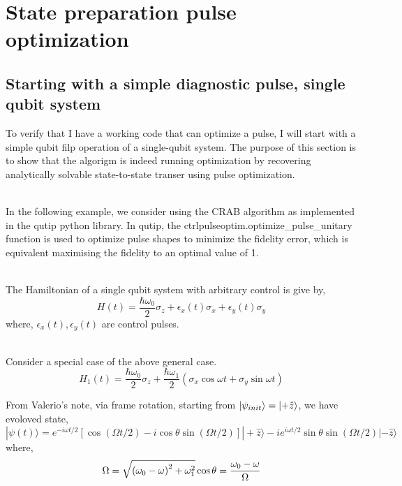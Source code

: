 \documentclass{article}
\begin{document}
\section{State preparation pulse optimization}

\subsection{Starting with a simple diagnostic pulse, single qubit system}
To verify that I have a working code that can optimize a pulse, 
I will start with a simple qubit filp operation of a single-qubit system.
The purpose of this section is to show that the algorigm is indeed running optimization
by recovering analytically solvable state-to-state transer using pulse optimization. 

\\

In the following example, we consider using the CRAB algorithm as implemented in the 
qutip python library. In qutip, the ctrlpulseoptim.optimize_pulse_unitary function is used 
to optimize pulse shapes to minimize the fidelity error, which is equivalent maximising the fidelity to an optimal value of 1.

\\

The Hamiltonian of a single qubit system with arbitrary control is give by, 
\begin{equation}
    H(t) = \frac{\hbar \omega_0}{2} \sigma_z + \epsilon_x(t)\sigma_x + \epsilon_y(t)\sigma_y 
\end{equation}
where, $\epsilon_x(t), \epsilon_y(t)$ are control pulses.  

\\

Consider a special case of the above general case. 
\begin{equation}
    H_1(t) = \frac{\hbar \omega_0}{2} \sigma_z + \frac{\hbar \omega_1}{2}(\sigma_x\cos{\omega t} + \sigma_y\sin{\omega t})    
\end{equation}

From Valerio's note, via frame rotation, starting from $\ket{\psi_{init}} = \ket{+\hat{z}}$, 
we have evoloved state, 
\begin{equation}
    |\psi(t)\rangle=e^{-i \omega t / 2}[\cos (\Omega t / 2)-i \cos \theta \sin (\Omega t / 2)]|+\hat{z}\rangle-i e^{i \omega t / 2} \sin \theta \sin (\Omega t / 2)|-\hat{z}\rangle
\end{equation}
where, 
$$
\Omega=\sqrt{\left(\omega_0-\omega\right)^2+\omega_1^2} \\
\cos \theta=\frac{\omega_0-\omega}{\Omega}
$$
\end{document}
